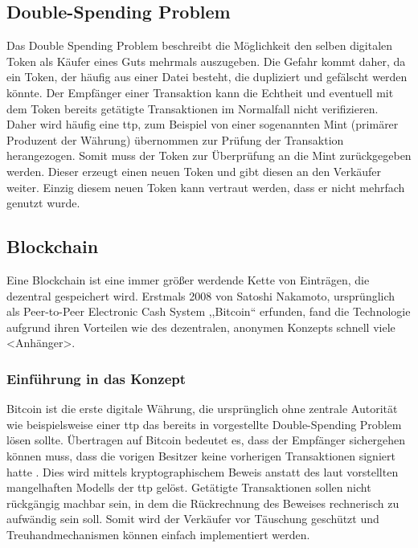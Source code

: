 \subsection{Double-Spending Problem}
\label{sec:doublespend}
	Das Double Spending Problem beschreibt die Möglichkeit den selben digitalen Token als Käufer eines Guts mehrmals auszugeben\cite{Chohan2017}.
	Die Gefahr kommt daher, da ein Token, der häufig aus einer Datei besteht, die dupliziert und gefälscht werden könnte\cite{Chohan2017}.
	Der Empfänger einer Transaktion kann die Echtheit und eventuell mit dem Token bereits getätigte Transaktionen im Normalfall nicht verifizieren\cite{Nakamoto2008}.
	Daher wird häufig eine \gls{ttp}, zum Beispiel von einer sogenannten Mint (primärer Produzent der Währung) übernommen zur Prüfung der Transaktion herangezogen\cite{Nakamoto2008}.
	Somit muss der Token zur Überprüfung an die Mint zurückgegeben werden. 
	Dieser erzeugt einen neuen Token und gibt diesen an den Verkäufer weiter.
	Einzig diesem neuen Token kann vertraut werden, dass er nicht mehrfach genutzt wurde\cite{Nakamoto2008}.
	
\subsection{Blockchain}
\label{sec:blockchain}
    Eine Blockchain ist eine immer größer werdende Kette von Einträgen, die dezentral gespeichert wird. 
    Erstmals 2008 von Satoshi Nakamoto, ursprünglich als Peer-to-Peer Electronic Cash System ,,Bitcoin`` erfunden, fand die Technologie aufgrund ihren Vorteilen wie des dezentralen, anonymen Konzepts schnell viele <Anhänger>. 
    
    \subsubsection{Einführung in das Konzept}
    \label{sec:blockchain_introduction}
    Bitcoin ist die erste digitale Währung, die ursprünglich ohne zentrale Autorität wie beispielsweise einer \gls{ttp} das bereits in  vorgestellte Double-Spending Problem lösen sollte\cite{Nakamoto2008}. 
    Übertragen auf Bitcoin bedeutet es, dass der Empfänger sichergehen können muss, dass die vorigen Besitzer keine vorherigen Transaktionen signiert hatte \cite{Nakamoto2008}.
    Dies wird mittels kryptographischem Beweis anstatt des laut \citeauthor{Nakamoto2008} vorstellten mangelhaften Modells der \gls{ttp} gelöst.
    Getätigte Transaktionen sollen nicht rückgängig machbar sein, in dem die Rückrechnung des Beweises rechnerisch zu aufwändig sein soll\cite{Nakamoto2008}.
    Somit wird der Verkäufer vor Täuschung geschützt und Treuhandmechanismen können einfach implementiert werden\cite{Nakamoto2008}.  
    
